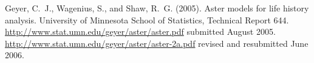 \documentclass[11pt]{article}
\begin{document}
\begin{thebibliography}{}

Geyer, C.~J., Wagenius, S., and Shaw, R.~G. (2005).
\newblock Aster models for life history analysis.
\newblock University of Minnesota School of Statistics, Technical Report 644.
\newblock \url{http://www.stat.umn.edu/geyer/aster/aster.pdf} submitted
    August 2005.
\newblock \url{http://www.stat.umn.edu/geyer/aster/aster-2a.pdf} revised
    and resubmitted June 2006.

\end{thebibliography}
\end{document}
